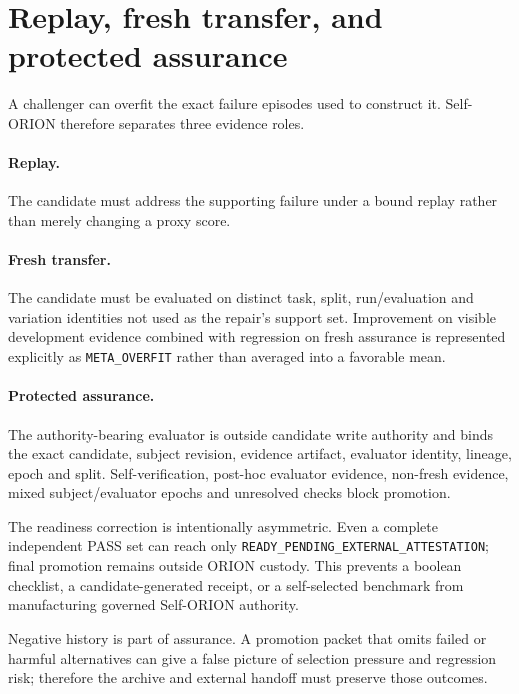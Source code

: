 \section{Replay, fresh transfer, and protected assurance}

A challenger can overfit the exact failure episodes used to construct it. Self-ORION therefore separates three evidence roles.

\paragraph{Replay.}
The candidate must address the supporting failure under a bound replay rather than merely changing a proxy score.

\paragraph{Fresh transfer.}
The candidate must be evaluated on distinct task, split, run/evaluation and variation identities not used as the repair's support set. Improvement on visible development evidence combined with regression on fresh assurance is represented explicitly as \texttt{META\_OVERFIT} rather than averaged into a favorable mean.

\paragraph{Protected assurance.}
The authority-bearing evaluator is outside candidate write authority and binds the exact candidate, subject revision, evidence artifact, evaluator identity, lineage, epoch and split. Self-verification, post-hoc evaluator evidence, non-fresh evidence, mixed subject/evaluator epochs and unresolved checks block promotion.

The readiness correction is intentionally asymmetric. Even a complete independent PASS set can reach only \texttt{READY\_PENDING\_EXTERNAL\_ATTESTATION}; final promotion remains outside ORION custody. This prevents a boolean checklist, a candidate-generated receipt, or a self-selected benchmark from manufacturing governed Self-ORION authority.

Negative history is part of assurance. A promotion packet that omits failed or harmful alternatives can give a false picture of selection pressure and regression risk; therefore the archive and external handoff must preserve those outcomes.
